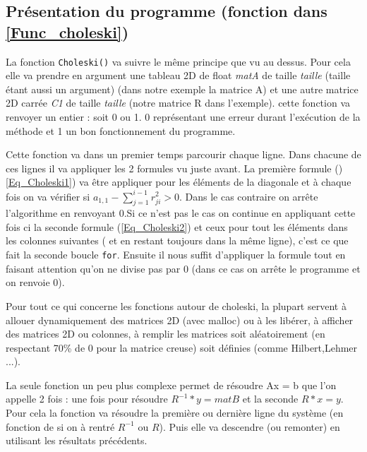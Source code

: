 \documentclass[12pt]{article}
\begin{document}
\vspace{1cm}

\subsection{Présentation du programme (fonction dans \ref{Func_choleski})}

\begin{multicols}{2}

  La fonction \texttt{Choleski()} va suivre le même principe que vu au dessus. Pour cela elle va prendre en argument une tableau 2D de float \textit{matA} de taille \textit{taille} (taille étant aussi un argument) (dans notre exemple la matrice A) et une autre matrice 2D carrée  \textit{C1} de taille  \textit{taille} (notre matrice R dans l'exemple).
  cette fonction va renvoyer un entier : soit 0 ou 1. 0 représentant une erreur durant l'exécution de la méthode et 1 un bon fonctionnement du programme.

  Cette fonction va dans un premier temps parcourir chaque ligne. Dans chacune de ces lignes il va appliquer les 2 formules vu juste avant. La première formule ()\ref{Eq_Choleski1}) va être appliquer pour les éléments de la diagonale et à chaque fois on va vérifier si $a_{1,1} - \sum_{j = 1}^{i-1} r_{j i}^2 > 0$. Dans le cas contraire on arrête l'algorithme en renvoyant 0.Si ce n'est pas le cas on continue en appliquant cette fois ci la seconde formule (\ref{Eq_Choleski2}) et ceux pour tout les éléments dans les colonnes suivantes ( et en restant toujours dans la même ligne), c'est ce que fait la seconde boucle \texttt{for}. Ensuite il nous suffit d'appliquer la formule tout en faisant attention qu'on ne divise pas par 0 (dans ce cas on arrête le programme et on renvoie 0).
  
  Pour tout ce qui concerne les fonctions autour de choleski, la plupart servent à allouer dynamiquement des matrices 2D (avec malloc) ou à les libérer, à afficher des matrices 2D ou colonnes, à remplir les matrices soit aléatoirement (en respectant 70\% de 0 pour la matrice creuse) soit définies (comme Hilbert,Lehmer ...).
  
  La seule fonction un peu plus complexe permet de résoudre Ax = b que l'on appelle 2 fois : une fois pour résoudre $R^{-1}*y=matB$ et la seconde $R*x = y$. Pour cela la fonction va résoudre la première ou dernière ligne du système (en fonction de si on à rentré  $R^{-1}$ ou $R$). Puis elle va descendre (ou remonter) en utilisant les résultats précédents.
  

\end{multicols}
\end{document}
